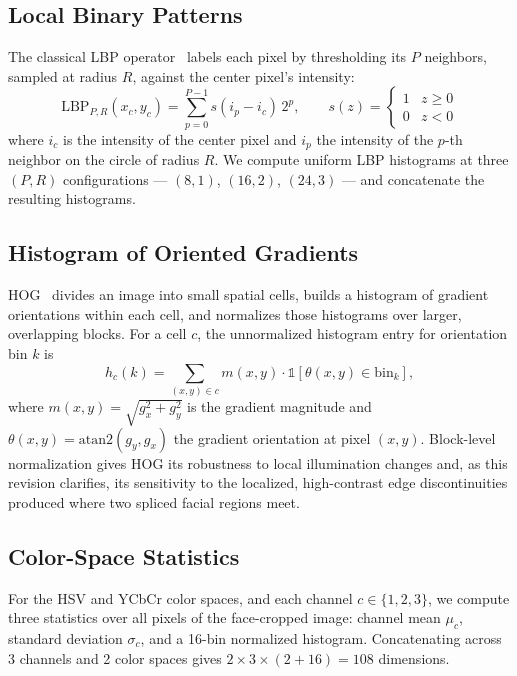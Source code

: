 \documentclass[11pt]{article}
\begin{document}
\subsection{Local Binary Patterns}

The classical LBP operator~\cite{ojala2002} labels each pixel by thresholding its $P$ neighbors, sampled at radius $R$, against the center pixel's intensity:
\begin{equation}
\mathrm{LBP}_{P,R}(x_c,y_c) = \sum_{p=0}^{P-1} s(i_p - i_c)\, 2^p, \qquad
s(z) = \begin{cases} 1 & z \geq 0 \\ 0 & z < 0 \end{cases}
\end{equation}
where $i_c$ is the intensity of the center pixel and $i_p$ the intensity of the $p$-th neighbor on the circle of radius $R$. We compute uniform LBP histograms at three $(P,R)$ configurations --- $(8,1)$, $(16,2)$, $(24,3)$ --- and concatenate the resulting histograms.

\subsection{Histogram of Oriented Gradients}

HOG~\cite{dalal2005} divides an image into small spatial cells, builds a histogram of gradient orientations within each cell, and normalizes those histograms over larger, overlapping blocks. For a cell $c$, the unnormalized histogram entry for orientation bin $k$ is
\begin{equation}
h_c(k) = \sum_{(x,y)\in c} m(x,y)\cdot \mathbb{1}[\theta(x,y) \in \mathrm{bin}_k],
\end{equation}
where $m(x,y) = \sqrt{g_x^2+g_y^2}$ is the gradient magnitude and $\theta(x,y)=\mathrm{atan2}(g_y,g_x)$ the gradient orientation at pixel $(x,y)$. Block-level normalization gives HOG its robustness to local illumination changes and, as this revision clarifies, its sensitivity to the localized, high-contrast edge discontinuities produced where two spliced facial regions meet.

\subsection{Color-Space Statistics}

For the HSV and YCbCr color spaces, and each channel $c\in\{1,2,3\}$, we compute three statistics over all pixels of the face-cropped image: channel mean $\mu_c$, standard deviation $\sigma_c$, and a 16-bin normalized histogram. Concatenating across 3 channels and 2 color spaces gives $2\times 3\times(2+16)=108$ dimensions.
\end{document}
